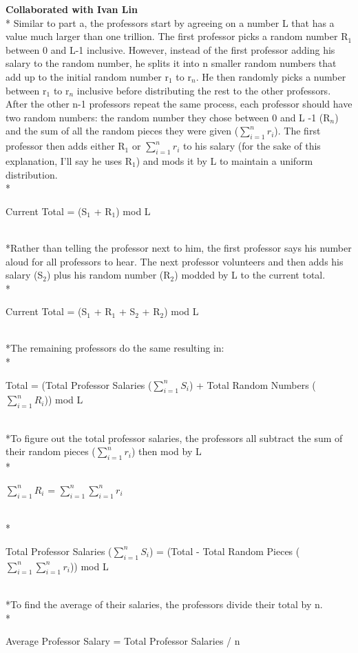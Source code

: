 \documentclass[12pt]{article}
\begin{document}
\noindent
\textbf{Collaborated with Ivan Lin}
\\* Similar to part a, the professors start by agreeing on a number L that has a value much larger than one trillion. The first professor picks a random number R$_1$ between 0 and L-1 inclusive. However, instead of the first professor adding his salary to the random number, he splits it into n smaller random numbers that add up to the initial random number r$_1$ to r$_n$. He then randomly picks a number between r$_1$ to r$_n$ inclusive before distributing the rest to the other professors. After the other n-1 professors repeat the same process, each professor should have two random numbers: the random number they chose between 0 and L -1 (R$_n$) and the sum of all the random pieces they were given ($\sum_{i=1}^{n} r_{i}$). 
The first professor then adds either R$_1$ or $\sum_{i=1}^{n} r_{i}$ to his salary (for the sake of this explanation, I'll say he uses R$_1$) and mods it by L to maintain a uniform distribution. 
\smallskip
\\*\centerline{Current Total = (S$_1$ + R$_1$) mod L}
\smallskip 
\\*Rather than telling the professor next to him, the first professor says his number aloud for all professors to hear. The next professor volunteers and then adds his salary (S$_2$) plus his random number (R$_2$) modded by L to the current total.
\\*\centerline{Current Total = (S$_1$ + R$_1$ + S$_2$ + R$_2$) mod L}
\smallskip
\\*The remaining professors do the same resulting in:
\smallskip
\\*\centerline{Total = (Total Professor Salaries ($\sum_{i=1}^{n} S_{i}$) + Total Random Numbers ($\sum_{i=1}^{n} R_{i}$)) mod L}
\smallskip
\\*To figure out the total professor salaries, the professors all subtract the sum of their random pieces ($\sum_{i=1}^{n} r_{i}$) then mod by L
\\*\centerline{$\sum_{i=1}^{n} R_{i}$ = $\sum_{i=1}^{n}\sum_{i=1}^{n} r_{i}$}
\smallskip
\\*\centerline{Total Professor Salaries ($\sum_{i=1}^{n} S_{i}$) = (Total - Total Random Pieces ($\sum_{i=1}^{n}\sum_{i=1}^{n} r_{i}$)) mod L}
\smallskip
\\*To find the average of their salaries, the professors divide their total by n.
\smallskip
\\*\centerline{Average Professor Salary = Total Professor Salaries / n}
\end{document}
